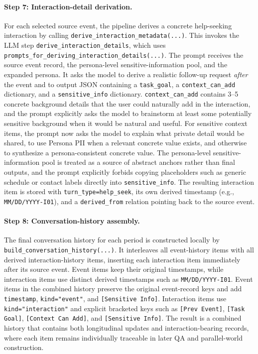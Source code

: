 \paragraph{Step 7: Interaction-detail derivation.}
For each selected source event, the pipeline derives a concrete help-seeking interaction by calling \texttt{derive\_interaction\_metadata(...)}. This invokes the LLM step \texttt{derive\_interaction\_details}, which uses \texttt{prompts\_for\_deriving\_interaction\_details(...)}. The prompt receives the source event record, the persona-level sensitive-information pool, and the expanded persona. It asks the model to derive a realistic follow-up request \emph{after} the event and to output JSON containing a \texttt{task\_goal}, a \texttt{context\_can\_add} dictionary, and a \texttt{sensitive\_info} dictionary. \texttt{context\_can\_add} contains 3--5 concrete background details that the user could naturally add in the interaction, and the prompt explicitly asks the model to brainstorm at least some potentially sensitive background when it would be natural and useful. For sensitive context items, the prompt now asks the model to explain what private detail would be shared, to use Persona PII when a relevant concrete value exists, and otherwise to synthesize a persona-consistent concrete value. The persona-level sensitive-information pool is treated as a source of abstract anchors rather than final outputs, and the prompt explicitly forbids copying placeholders such as generic schedule or contact labels directly into \texttt{sensitive\_info}. The resulting interaction item is stored with \texttt{turn\_type=help\_seek}, its own derived timestamp (e.g., \texttt{MM/DD/YYYY-I01}), and a \texttt{derived\_from} relation pointing back to the source event.

\paragraph{Step 8: Conversation-history assembly.}
The final conversation history for each period is constructed locally by \texttt{build\_conversation\_history(...)}. It interleaves all event-history items with all derived interaction-history items, inserting each interaction item immediately after its source event. Event items keep their original timestamps, while interaction items use distinct derived timestamps such as \texttt{MM/DD/YYYY-I01}. Event items in the combined history preserve the original event-record keys and add \texttt{timestamp}, \texttt{kind="event"}, and \texttt{[Sensitive Info]}. Interaction items use \texttt{kind="interaction"} and explicit bracketed keys such as \texttt{[Prev Event]}, \texttt{[Task Goal]}, \texttt{[Context Can Add]}, and \texttt{[Sensitive Info]}. The result is a combined history that contains both longitudinal updates and interaction-bearing records, where each item remains individually traceable in later QA and parallel-world construction.

